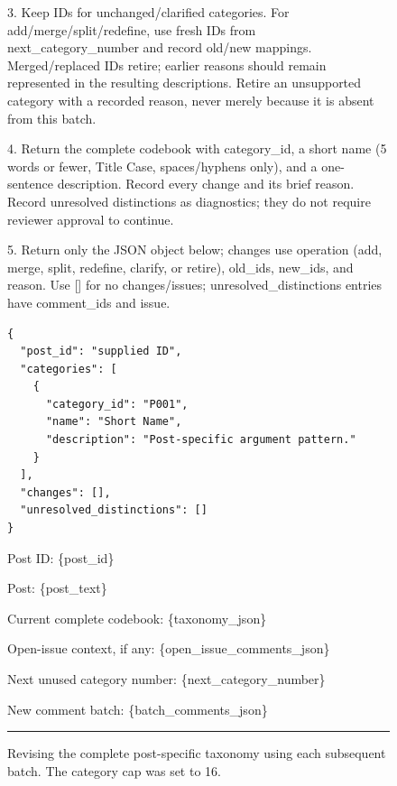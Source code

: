 \begin{figure}[H]
\begin{minipage}{0.97\textwidth}
3. Keep IDs for unchanged/clarified categories. For add/merge/split/redefine, use fresh IDs from next\_category\_number and record old/new mappings. Merged/replaced IDs retire; earlier reasons should remain represented in the resulting descriptions. Retire an unsupported category with a recorded reason, never merely because it is absent from this batch.

4. Return the complete codebook with category\_id, a short name (5 words or fewer, Title Case, spaces/hyphens only), and a one-sentence description. Record every change and its brief reason. Record unresolved distinctions as diagnostics; they do not require reviewer approval to continue.

5. Return only the JSON object below; changes use operation (add, merge, split, redefine, clarify, or retire), old\_ids, new\_ids, and reason. Use [] for no changes/issues; unresolved\_distinctions entries have comment\_ids and issue.

\begin{verbatim}
{
  "post_id": "supplied ID",
  "categories": [
    {
      "category_id": "P001",
      "name": "Short Name",
      "description": "Post-specific argument pattern."
    }
  ],
  "changes": [],
  "unresolved_distinctions": []
}
\end{verbatim}

Post ID: \{post\_id\}

Post: \{post\_text\}

Current complete codebook: \{taxonomy\_json\}

Open-issue context, if any: \{open\_issue\_comments\_json\}

Next unused category number: \{next\_category\_number\}

New comment batch: \{batch\_comments\_json\}

\vspace{0.6em}
\hrule
\end{minipage}
\caption{Revising the complete post-specific taxonomy using each subsequent batch. The category cap was set to 16.}
\label{fig:moral-reason-revise-prompt}
\end{figure}
